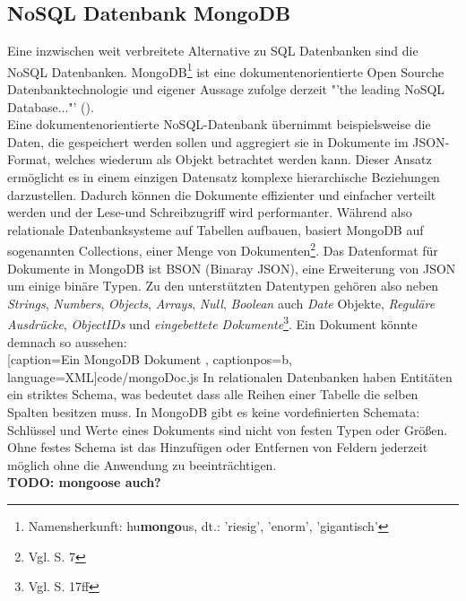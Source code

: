 \subsection{NoSQL Datenbank MongoDB}
Eine inzwischen weit verbreitete Alternative zu \gls{SQL} Datenbanken sind die \gls{NoSQL} Datenbanken. MongoDB\footnote{ Namensherkunft: hu\textbf{mongo}us, dt.: 'riesig', 'enorm', 'gigantisch'} ist eine dokumentenorientierte Open Sourche Datenbanktechnologie und eigener Aussage zufolge derzeit "'the leading NoSQL Database..."' (\cite{mongodb}). \\
Eine dokumentenorientierte \gls{NoSQL}-Datenbank übernimmt beispielsweise die Daten, die gespeichert werden sollen und aggregiert sie in Dokumente im \gls{JSON}-Format, welches wiederum als Objekt betrachtet werden kann. Dieser Ansatz ermöglicht es in einem einzigen Datensatz komplexe hierarchische Beziehungen darzustellen. Dadurch können die Dokumente effizienter und einfacher verteilt werden und der Lese-und Schreibzugriff wird performanter. Während also relationale Datenbanksysteme auf Tabellen aufbauen, basiert MongoDB auf sogenannten Collections, einer Menge von Dokumenten\footnote{Vgl. \cite{mongoDef} S. 7}. Das Datenformat für Dokumente in MongoDB ist BSON (Binaray JSON), eine Erweiterung von \gls{JSON} um einige binäre Typen. Zu den unterstützten Datentypen gehören also neben \textit{Strings}, \textit{Numbers}, \textit{Objects}, \textit{Arrays}, \textit{Null}, \textit{Boolean} auch \textit{Date} Objekte, \textit{Reguläre Ausdrücke}, \textit{ObjectIDs} und \textit{eingebettete Dokumente}\footnote{Vgl. \cite{mongoDef} S. 17ff}. Ein Dokument könnte demnach so aussehen: \\

	[caption={Ein MongoDB Dokument}
	\label{code:mongo}, captionpos=b, language=XML]{code/mongoDoc.js}
In relationalen Datenbanken haben Entitäten ein striktes Schema, was bedeutet dass alle Reihen einer Tabelle die selben Spalten besitzen muss. In MongoDB gibt es keine vordefinierten Schemata: Schlüssel und Werte eines Dokuments sind nicht von festen Typen oder Größen. Ohne festes Schema ist das Hinzufügen oder Entfernen von Feldern jederzeit möglich ohne die Anwendung zu beeinträchtigen.\\
\textbf{\large TODO: mongoose auch?}
